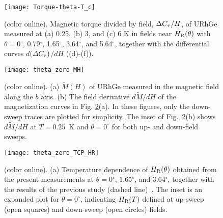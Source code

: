 \documentclass[twocolumn, aps, superscriptaddress, amsfonts,floatfix]{revtex4}%
\begin{document}
{%
\begin{figure*}[t]
\begin{center}
\texttt{[image: Torque-theta-T\_c]}
\caption{(color online). Magnetic torque divided by field, $\Delta C_{\rm\tau}/H$, of URhGe measured at (a) 0.25, (b) 3, and  (c) 6 K in fields near $H_{\rm R}(\theta)$ with $\theta = 0$$^\circ$, 0.79$^\circ$, 1.65$^\circ$, 3.64$^\circ$, and 5.64$^\circ$,  together with the differential curves $d(\Delta$$C_{\rm \tau})$$/dH$ ((d)-(f)).
\label{Torque-theta-T_c}}
\end{center}
\end{figure*}
\begin{figure}[t]
\begin{flushright}
\texttt{[image: theta\_zero\_MH]}
\end{flushright}
\caption{(color online).  (a) $\tilde{M}(H)$  of URhGe measured in the magnetic field along the $b$ axis.
 (b) The field derivative $d\tilde{M}/dH$ of the magnetization curves in Fig. \ref{theta_zero_MH}(a). In these figures, only the down-sweep traces are plotted for simplicity. The inset of Fig.~\ref{theta_zero_MH}(b) shows  $d\tilde{M}/dH$ at $T=0.25$~K and $\theta=0^\circ$ for both up- and down-field sweeps.
\label{theta_zero_MH}}
\end{figure}
\begin{figure}[t]
\begin{flushright}
\texttt{[image: theta\_zero\_TCP\_HR]}
\end{flushright}
\caption{(color online).  (a)  Temperature dependence of  $H_{\rm R}(\theta)$ obtained from the present measurements at $\theta = 0$$^\circ$, 1.65$^\circ$, and 3.64$^\circ$,
 together with the results of the previous study (dashed line)~\cite{hardy2011transverse}. The inset is an expanded plot for $\theta=0^\circ$, indicating $H_{\rm R}(T)$ defined at up-sweep (open squares) and down-sweep (open circles) fields.
$$}
\end{figure}}
\end{document}
